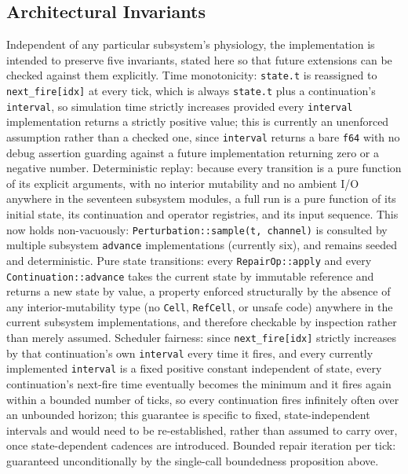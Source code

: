 \documentclass[11pt]{article}
\begin{document}
\subsection{Architectural Invariants}

Independent of any particular subsystem's physiology, the implementation is intended to preserve five invariants, stated here so that future extensions can be checked against them explicitly. Time monotonicity: \texttt{state.t} is reassigned to \texttt{next\_fire[idx]} at every tick, which is always \texttt{state.t} plus a continuation's \texttt{interval}, so simulation time strictly increases provided every \texttt{interval} implementation returns a strictly positive value; this is currently an unenforced assumption rather than a checked one, since \texttt{interval} returns a bare \texttt{f64} with no debug assertion guarding against a future implementation returning zero or a negative number. Deterministic replay: because every transition is a pure function of its explicit arguments, with no interior mutability and no ambient I/O anywhere in the seventeen subsystem modules, a full run is a pure function of its initial state, its continuation and operator registries, and its input sequence. This now holds non-vacuously: \texttt{Perturbation::sample(t, channel)} is consulted by multiple subsystem \texttt{advance} implementations (currently six), and remains seeded and deterministic. Pure state transitions: every \texttt{RepairOp::apply} and every \texttt{Continuation::advance} takes the current state by immutable reference and returns a new state by value, a property enforced structurally by the absence of any interior-mutability type (no \texttt{Cell}, \texttt{RefCell}, or unsafe code) anywhere in the current subsystem implementations, and therefore checkable by inspection rather than merely assumed. Scheduler fairness: since \texttt{next\_fire[idx]} strictly increases by that continuation's own \texttt{interval} every time it fires, and every currently implemented \texttt{interval} is a fixed positive constant independent of state, every continuation's next-fire time eventually becomes the minimum and it fires again within a bounded number of ticks, so every continuation fires infinitely often over an unbounded horizon; this guarantee is specific to fixed, state-independent intervals and would need to be re-established, rather than assumed to carry over, once state-dependent cadences are introduced. Bounded repair iteration per tick: guaranteed unconditionally by the single-call boundedness proposition above.
\end{document}
